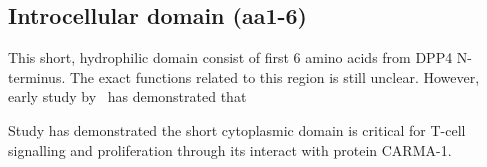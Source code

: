 \subsection{Introcellular domain (aa1-6)}

This short, hydrophilic domain consist of first 6 amino acids from DPP4 N-terminus. The exact functions related to this region is still unclear. However, early study by ~\citet{Hong1990}has demonstrated that 

Study has demonstrated the short cytoplasmic domain is critical for T-cell signalling and proliferation through its interact with protein CARMA-1. \cite{Ohnuma_2007}